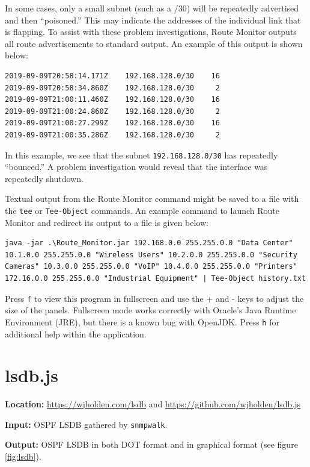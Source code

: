 \documentclass[12pt]{article}
\begin{document}
In some cases, only a small subnet (such as a /30) will be repeatedly advertised and then ``poisoned.'' This may indicate the addresses of the individual link that is flapping. To assist with these problem investigations, Route Monitor outputs all route advertisements to standard output. An example of this output is shown below:

\begin{lstlisting}
2019-09-09T20:58:14.171Z	192.168.128.0/30   	16
2019-09-09T20:58:34.860Z	192.168.128.0/30   	 2
2019-09-09T21:00:11.460Z	192.168.128.0/30   	16
2019-09-09T21:00:24.860Z	192.168.128.0/30   	 2
2019-09-09T21:00:27.299Z	192.168.128.0/30   	16
2019-09-09T21:00:35.286Z	192.168.128.0/30   	 2
\end{lstlisting}

In this example, we see that the subnet \texttt{192.168.128.0/30} has repeatedly ``bounced.'' A problem investigation would reveal that the interface was repeatedly shutdown.

Textual output from the Route Monitor command might be saved to a file with the \texttt{tee} or \texttt{Tee-Object} commands. An example command to launch Route Monitor and redirect its output to a file is given below:

\begin{lstlisting}
java -jar .\Route_Monitor.jar 192.168.0.0 255.255.0.0 "Data Center" 10.1.0.0 255.255.0.0 "Wireless Users" 10.2.0.0 255.255.0.0 "Security Cameras" 10.3.0.0 255.255.0.0 "VoIP" 10.4.0.0 255.255.0.0 "Printers" 172.16.0.0 255.255.0.0 "Industrial Equipment" | Tee-Object history.txt
\end{lstlisting}

Press \texttt{f} to view this program in fullscreen and use the + and - keys to adjust the size of the panels. Fullscreen mode works correctly with Oracle's Java Runtime Environment (JRE), but there is a known bug with OpenJDK. Press \texttt{h} for additional help within the application.

\section{lsdb.js}

\noindent \textbf{Location:} \url{https://wjholden.com/lsdb} and \url{https://github.com/wjholden/lsdb.js}

\noindent \textbf{Input:} OSPF LSDB gathered by \texttt{snmpwalk}.

\noindent \textbf{Output:} OSPF LSDB in both DOT format and in graphical format (see figure \ref{fig:lsdb}).
\end{document}
